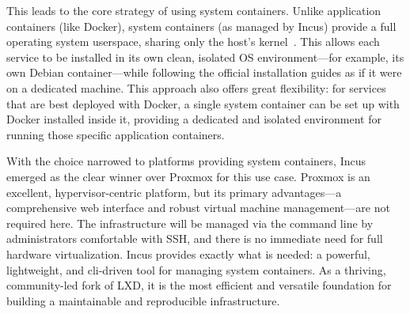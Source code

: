 This leads to the core strategy of using system containers. Unlike application containers (like Docker), system containers (as managed by Incus) provide a full operating system userspace, sharing only the host's kernel~\cite{incus-linux-containers-2023}. This allows each service to be installed in its own clean, isolated OS environment—for example, its own Debian container—while following the official installation guides as if it were on a dedicated machine. This approach also offers great flexibility: for services that are best deployed with Docker, a single system container can be set up with Docker installed inside it, providing a dedicated and isolated environment for running those specific application containers.

With the choice narrowed to platforms providing system containers, Incus emerged as the clear winner over Proxmox for this use case. Proxmox is an excellent, hypervisor-centric platform, but its primary advantages—a comprehensive web interface and robust virtual machine management—are not required here. The infrastructure will be managed via the command line by administrators comfortable with SSH, and there is no immediate need for full hardware virtualization. Incus provides exactly what is needed: a powerful, lightweight, and \gls{cli}-driven tool for managing system containers. As a thriving, community-led fork of LXD, it is the most efficient and versatile foundation for building a maintainable and reproducible infrastructure.
